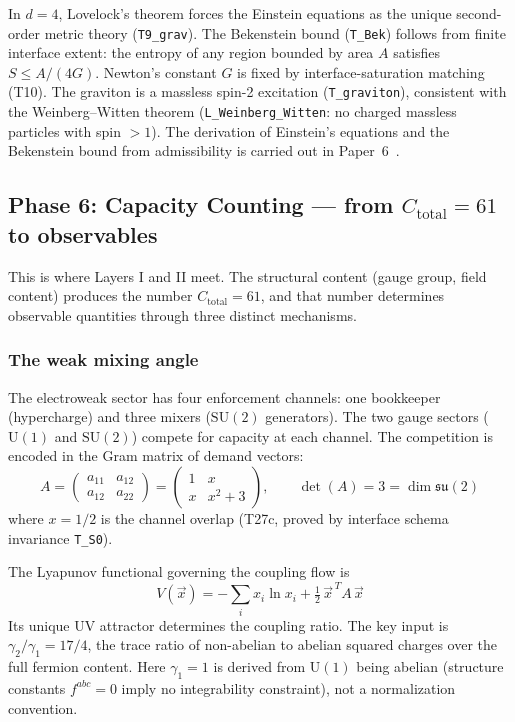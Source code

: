 \documentclass[11pt]{article}
\newcommand{\SU}{\mathrm{SU}}
\newcommand{\U}{\mathrm{U}}
\begin{document}
In $d=4$, Lovelock's theorem forces the Einstein equations as the unique second-order metric theory (\texttt{T9\_grav}).  The Bekenstein bound (\texttt{T\_Bek}) follows from finite interface extent: the entropy of any region bounded by area $A$ satisfies $S \le A/(4G)$.  Newton's constant $G$ is fixed by interface-saturation matching (T10).  The graviton is a massless spin-2 excitation (\texttt{T\_graviton}), consistent with the Weinberg--Witten theorem (\texttt{L\_Weinberg\_Witten}: no charged massless particles with spin ${>}1$).  The derivation of Einstein's equations and the Bekenstein bound from admissibility is carried out in Paper~6~\cite{P6}.


\subsection{Phase 6: Capacity Counting --- from \texorpdfstring{$C_{\mathrm{total}}=61$}{Ctotal=61} to observables}

This is where Layers I and II meet.  The structural content (gauge group, field content) produces the number $C_{\mathrm{total}} = 61$, and that number determines observable quantities through three distinct mechanisms.

\subsubsection{The weak mixing angle}

The electroweak sector has four enforcement channels: one bookkeeper (hypercharge) and three mixers ($\SU(2)$ generators).  The two gauge sectors ($\U(1)$ and $\SU(2)$) compete for capacity at each channel.  The competition is encoded in the Gram matrix of demand vectors:
\begin{equation}
A = \begin{pmatrix} a_{11} & a_{12} \\ a_{12} & a_{22} \end{pmatrix} = \begin{pmatrix} 1 & x \\ x & x^2 + 3 \end{pmatrix}, \qquad \det(A) = 3 = \dim\mathfrak{su}(2)
\end{equation}
where $x = 1/2$ is the channel overlap (T27c, proved by interface schema invariance \texttt{T\_S0}).

The Lyapunov functional governing the coupling flow is
\begin{equation}
V(\vec{x}) = -\sum_i x_i \ln x_i + \tfrac{1}{2}\, \vec{x}^{\,T} A\, \vec{x}
\end{equation}
Its unique UV attractor determines the coupling ratio.  The key input is $\gamma_2/\gamma_1 = 17/4$, the trace ratio of non-abelian to abelian squared charges over the full fermion content.  Here $\gamma_1 = 1$ is derived from $\U(1)$ being abelian (structure constants $f^{abc} = 0$ imply no integrability constraint), not a normalization convention.
\end{document}
